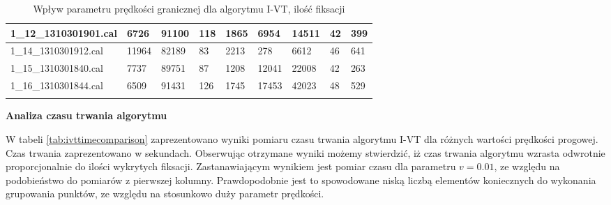 {\begin{longtable}{l|l|l|l|l|l|l|l|l|}
    \multicolumn{1}{|l|}{1\_12\_1310301901.cal} & 6726 & \cellcolor[HTML]{EFEFEF}91100 & 118 & \cellcolor[HTML]{EFEFEF}1865 & 6954 & \cellcolor[HTML]{EFEFEF}14511 & 42 & \cellcolor[HTML]{EFEFEF}399 \\ \hline
    \multicolumn{1}{|l|}{1\_14\_1310301912.cal} & 11964 & \cellcolor[HTML]{EFEFEF}82189 & 83 & \cellcolor[HTML]{EFEFEF}2213 & 278 & \cellcolor[HTML]{EFEFEF}6612 & 46 & \cellcolor[HTML]{EFEFEF}641 \\ \hline
    \multicolumn{1}{|l|}{1\_15\_1310301840.cal} & 7737 & \cellcolor[HTML]{EFEFEF}89751 & 87 & \cellcolor[HTML]{EFEFEF}1208 & 12041 & \cellcolor[HTML]{EFEFEF}22008 & 42 & \cellcolor[HTML]{EFEFEF}263 \\ \hline
    \multicolumn{1}{|l|}{1\_16\_1310301844.cal} & 6509 & \cellcolor[HTML]{EFEFEF}91431 & 126 & \cellcolor[HTML]{EFEFEF}1745 & 17453 & \cellcolor[HTML]{EFEFEF}42023 & 48 & \cellcolor[HTML]{EFEFEF}529 \\ \hline
    \caption{Wpływ parametru prędkości granicznej dla algorytmu I-VT, ilość fiksacji}
    \label{tab:ivtfixationcomparison}\\
\end{longtable}
}
\textbf{Analiza czasu trwania algorytmu}\par
W tabeli \ref{tab:ivttimecomparison} zaprezentowano wyniki pomiaru czasu trwania algorytmu I-VT dla różnych wartości prędkości progowej. Czas trwania zaprezentowano w sekundach. Obserwując otrzymane wyniki możemy stwierdzić, iż czas trwania algorytmu wzrasta odwrotnie proporcjonalnie do ilości wykrytych fiksacji. Zastanawiającym wynikiem jest pomiar czasu dla parametru $v = 0.01$, ze względu na podobieństwo do pomiarów z pierwszej kolumny. Prawdopodobnie jest to spowodowane niską liczbą elementów koniecznych do wykonania grupowania punktów, ze względu na stosunkowo duży parametr prędkości.\par
